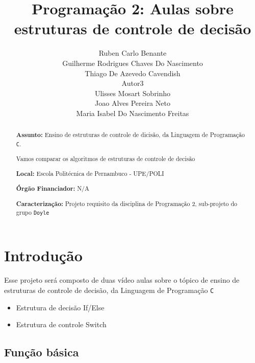 \documentclass[a4paper,10pt]{article}  %
\title{ Programação 2: 
        Aulas sobre estruturas de controle de decisão}
\author{Ruben Carlo Benante \\ Guilherme Rodrigues Chaves Do Nascimento \\ Thiago De Azevedo Cavendish \\ Autor3 \\ Ulisses Mosart Sobrinho \\ Joao Alves Pereira Neto \\ Maria Isabel Do Nascimento Freitas }
\begin{document}

\maketitle


\begin{abstract}

\textbf{Assunto:} Ensino de estruturas de controle de dicisão, da Linguagem de Programação \texttt{C}.

 Vamos comparar os algoritmos de estruturas de controle de decisão %

\textbf{Local:} Escola Politécnica de Pernambuco - UPE/POLI

\textbf{Órgão Financiador:} N/A

\textbf{Caracterização:} Projeto requisito da disciplina de Programação 2, sub-projeto do grupo \texttt{Doyle}


\end{abstract}




\section{Introdução}


   Esse projeto será composto de duas vídeo aulas sobre o tópico de ensino de estruturas de controle de decisão,  da Linguagem de Programação \texttt{C}

\begin{itemize}

 \item Estrutura de decisão If/Else
 \item Estrutura de controle Switch
\end{itemize}


 \subsection{Função básica}
\end{document}
